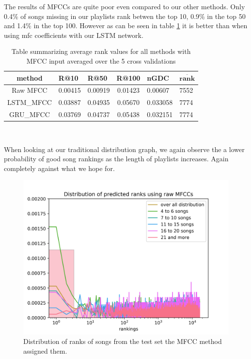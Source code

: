 The results of MFCCs are quite poor even compared to our other methods. Only 0.4\% of songs missing in our playlists rank betwen the top 10, 0.9\% in the top 50 and 1.4\% in the top 100. However as can be seen in table \ref{table:mfcc_methods} it is better than when using mfc coefficients with our LSTM network.
\begin{table}[h]
\centering
\renewcommand{\arraystretch}{1.5}
\begin{tabu} to 1\textwidth { | c || X[c] | X[c] | c | X[c] | X[c] |}
 \hline
 \textbf{method} & \textbf{R@10} & \textbf{R@50} & \textbf{R@100} & \textbf{nGDC} & $ \boldsymbol{\overline{rank}} $ \\
 \hline
 \hline
 Raw MFCC & 0.00415 & 0.00919 & 0.01423 & 0.00607 &  7552 \\
 \hline
 LSTM\_MFCC & 0.03887 & 0.04935 & 0.05670 & 0.033058 & 7774 \\
 \hline
 GRU\_MFCC & 0.03769 & 0.04737 & 0.05438 & 0.032151 & 7774 \\
 \hline
\end{tabu} \\

\caption{Table summarizing average rank values for all methods with MFCC input averaged over the 5 cross validations}
\label{table:mfcc_methods}
\end{table}

 When looking at our traditional distribution graph, we again observe the a lower probability of good song rankings as the length of playlists increases. Again completely against what we hope for. 
\begin{figure}[h]
    \centering
	\includegraphics[width=120mm]{./img/mfcc_graph.png}
	\caption{Distribution of ranks of songs from the test set the MFCC method assigned them.}
	\label{fig:mfcc_graph}
\end{figure}


